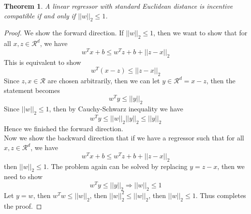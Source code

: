 \documentclass{article}
\newtheorem{theorem}{Theorem}[section]
\begin{document}
\begin{theorem}
A linear regressor with standard Euclidean distance is incentive compatible if and only if $||w||_2 \leq 1$.\\
\end{theorem}

\begin{proof}
We show the forward direction. If $||w||_2 \leq 1$, then we want to show that for all $x,z \in \mathcal{R}^d$, we have \[w^Tx + b \leq w^Tz + b + ||z-x||_2\]
This is equivalent to show \[w^T(x-z) \leq ||z-x||_2\] Since $z,x \in \mathcal{R}$ are chosen arbitrarily, then we can let $y \in \mathcal{R}^d = x - z$, then the statement becomes \[w^Ty \leq ||y||_2\] Since $||w||_2 \leq 1$, then by Cauchy-Schwarz inequality we have \[w^T y \leq ||w||_2||y||_2 \leq ||y||_2\] Hence we finished the forward direction.\\

\noindent Now we show the backward direction that if we have a regressor such that for all $x,z \in \mathcal{R}^d$, we have \[w^Tx + b \leq w^Tz + b + ||z-x||_2\] then $||w||_2 \leq 1$. The problem again can be solved by replacing $y = z-x$, then we need to show \[w^Ty \leq ||y||_2 \Rightarrow ||w||_2 \leq 1\] Let $y = w$, then $w^Tw \leq ||w||_2$, then $||w||^2_2 \leq ||w||_2$, then $||w||_2 \leq 1$. Thus completes the proof.
\end{proof}











\end{document}
